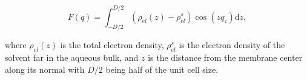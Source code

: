 \begin{equation} 
  F(q) = \int _{-D/2} ^{D/2} \left ( \rho_{el}(z) - \rho_{el}^s \right ) \cos (zq_z) \mathrm{d}z, 
\end{equation} 
 
\noindent where $\rho_{el} (z)$ is the total electron density, $\rho_{el}^s$ is the electron density of the solvent far in the aqueous bulk, and $z$ is the distance from the membrane center along its normal with $D/2$ being half of the unit cell size.   

